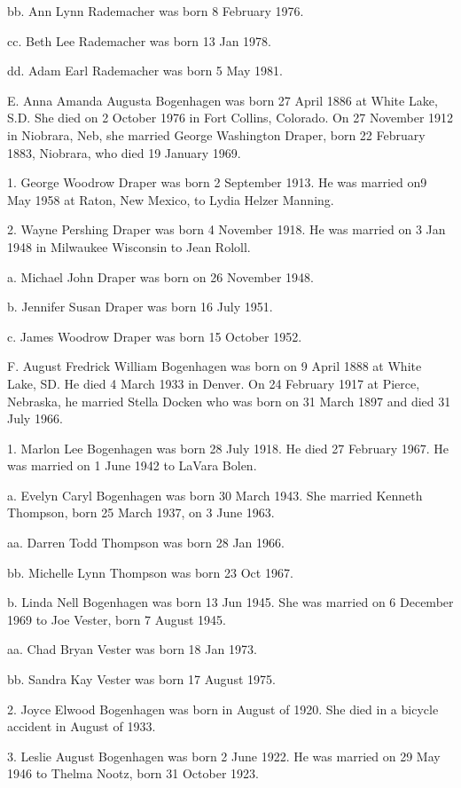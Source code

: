 \documentclass[a4paper]{article}
\begin{document}
bb. Ann Lynn Rademacher was born 8 February 1976.

cc. Beth Lee Rademacher was born 13 Jan 1978.

dd. Adam Earl Rademacher was born 5 May 1981.

E. Anna Amanda Augusta Bogenhagen was born 27 April 1886 at White Lake, S.D.  She died on 2 October 1976 in Fort Collins, Colorado.  On 27 November 1912 in Niobrara, Neb, she married George Washington Draper, born 22 February 1883, Niobrara, who died 19 January 1969.

1. George Woodrow Draper was born 2 September 1913.  He was married on9 May 1958 at Raton, New Mexico, to Lydia Helzer Manning.

2. Wayne Pershing Draper was born 4 November 1918.  He was married on 3 Jan 1948 in Milwaukee Wisconsin to Jean Rololl.
 
a. Michael John Draper was born on 26 November 1948.

b. Jennifer Susan Draper was born 16 July 1951.

c. James Woodrow Draper was born 15 October 1952.

F. August Fredrick William Bogenhagen was born on 9 April 1888 at White Lake, SD. He died 4 March 1933 in Denver.  On 24 February 1917 at Pierce, Nebraska, he married Stella Docken who was born on 31 March 1897 and died 31 July 1966.

1. Marlon Lee Bogenhagen was born 28 July 1918.  He died 27 February 1967. He was married on 1 June 1942 to LaVara Bolen.
 
a. Evelyn Caryl Bogenhagen was born 30 March 1943.  She married Kenneth Thompson, born 25 March 1937, on 3 June 1963.
 
aa. Darren Todd Thompson was born 28 Jan 1966.

bb. Michelle Lynn Thompson was born 23 Oct 1967.

b. Linda Nell Bogenhagen was born 13 Jun 1945.  She was married on 6 December 1969 to Joe Vester, born 7 August 1945.  
 
aa. Chad Bryan Vester was born 18 Jan 1973.

bb. Sandra Kay Vester was born 17 August 1975.

2. Joyce Elwood Bogenhagen was born in August of 1920.  She died in a bicycle accident in August of 1933.

3. Leslie August Bogenhagen was born 2 June 1922.  He was married on 29 May 1946 to Thelma Nootz, born 31 October 1923. 
\end{document}
